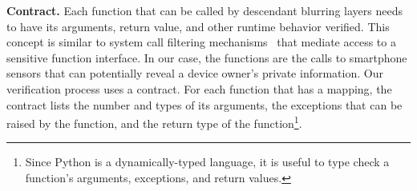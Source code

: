 \textbf{Contract.}
%
%
Each function that can be called by descendant blurring
layers needs to have its arguments, return value, and 
other runtime behavior verified. This concept is similar to system call filtering
mechanisms~\cite{acharya2000mapbox, fraser2000hardening} 
that mediate access to a sensitive function interface. In our case, 
the functions are the calls to smartphone sensors that 
can potentially reveal a device owner's private information. Our
verification process uses a contract. For each function that has a 
mapping, the contract lists the number 
and types of its arguments, the exceptions that can be raised 
by the function, and the return type of the function\footnote{\scriptsize 
Since Python is a dynamically-typed language, it is useful to type check 
a function's arguments, exceptions, and return values.}.

\begin{comment}
A contract is represented as a Python dictionary in Repy. As an example, if 
the blurring layer \path{foo} wanted to create a contract that would map
\path{get_battery()} and \path{restricted_get_accelerometer()} into 
a new namespace, the contract would be: 

\begin{Verbatim}
\{\textcolor{BrickRed}{'get_battery'}: \{
  \textcolor{BrickRed}{'type'}: \textcolor{BrickRed}{'func'},
  \textcolor{BrickRed}{'args'}: \textcolor{Purple}{None}, 
  \textcolor{BrickRed}{'exceptions'}: (\textcolor{Purple}{BatteryNotFoundError}), 
  \textcolor{BrickRed}{'return'}: dict,
  \textcolor{BrickRed}{'target'}: get_battery
  \}, 
\textcolor{BrickRed}{'get_accelerometer'}: \{
  \textcolor{BrickRed}{'type'}: \textcolor{BrickRed}{'func'},
  \textcolor{BrickRed}{'args'}: str, 
  \textcolor{BrickRed}{'exceptions'}: (\textcolor{Purple}{ValueError}), 
  \textcolor{BrickRed}{'return'}: list,
  \textcolor{BrickRed}{'target'}: restricted_get_accelerometer
  \}
\}
\end{Verbatim} 

Note that the symbols in the contract come from \path{foo}'s 
namespace. Thus the target for the \path{get_battery} in the 
contract is the \path{foo.get_battery} function. Similarly, the 
target for the \path{get_accelerometer} in the contract is the 
\path{foo.restricted_get_accelerometer}.
\end{comment}

